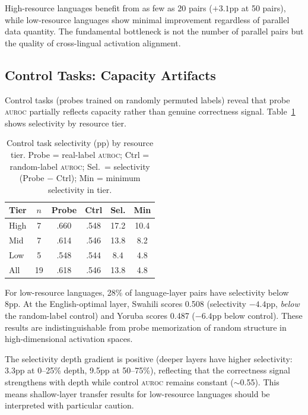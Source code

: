 \documentclass[11pt,a4paper]{article}
\newcommand{\auroc}{\textsc{auroc}}
\begin{document}
High-resource languages benefit from as few as 20 pairs ($+3.1$pp at 50 pairs), while low-resource languages show minimal improvement regardless of parallel data quantity. The fundamental bottleneck is not the number of parallel pairs but the quality of cross-lingual activation alignment.

\subsection{Control Tasks: Capacity Artifacts}
\label{sec:control}

Control tasks (probes trained on randomly permuted labels) reveal that probe \auroc{} partially reflects capacity rather than genuine correctness signal. Table~\ref{tab:control} shows selectivity by resource tier.

\begin{table}[t]
\centering
\small
\begin{tabular}{@{}lccccc@{}}
\toprule
\textbf{Tier} & \textbf{$n$} & \textbf{Probe} & \textbf{Ctrl} & \textbf{Sel.} & \textbf{Min} \\
\midrule
High & 7 & .660 & .548 & 17.2 & 10.4 \\
Mid & 7 & .614 & .546 & 13.8 & 8.2 \\
Low & 5 & .548 & .544 & 8.4 & 4.8 \\
All & 19 & .618 & .546 & 13.8 & 4.8 \\
\bottomrule
\end{tabular}
\caption{Control task selectivity (pp) by resource tier. Probe = real-label \auroc{}; Ctrl = random-label \auroc{}; Sel.\ = selectivity (Probe $-$ Ctrl); Min = minimum selectivity in tier.}
\label{tab:control}
\end{table}

For low-resource languages, 28\% of language-layer pairs have selectivity below 8pp. At the English-optimal layer, Swahili scores 0.508 (selectivity $-4.4$pp, \emph{below} the random-label control) and Yoruba scores 0.487 ($-6.4$pp below control). These results are indistinguishable from probe memorization of random structure in high-dimensional activation spaces.

The selectivity depth gradient is positive (deeper layers have higher selectivity: 3.3pp at 0--25\% depth, 9.5pp at 50--75\%), reflecting that the correctness signal strengthens with depth while control \auroc{} remains constant ($\sim$0.55). This means shallow-layer transfer results for low-resource languages should be interpreted with particular caution.
\end{document}
